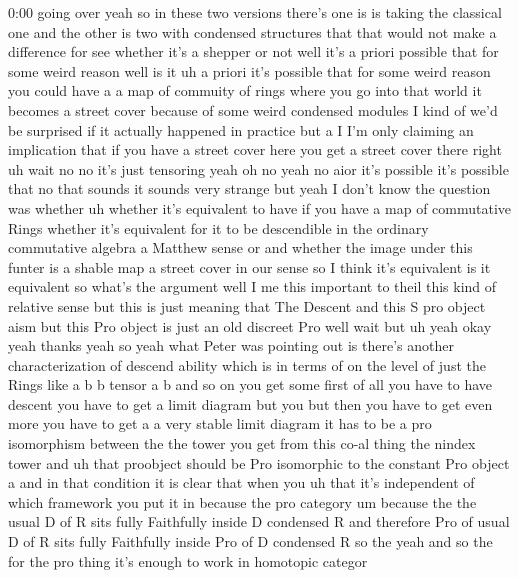 \begin{unfinished}{0:00}
going
over
yeah  so  in  these  two  versions  there's
one  is  is  taking  the  classical  one  and
the  other  is  two  with  condensed
structures  that  that  would  not  make  a
difference  for  see  whether  it's  a
shepper  or
not  well  it's  a  priori  possible  that  for
some  weird  reason  well  is
it
uh  a  priori  it's  possible  that  for  some
weird  reason  you  could  have  a  a  map  of
commuity  of  rings  where  you  go  into  that
world  it  becomes  a  street  cover  because
of  some  weird  condensed  modules
I  kind  of  we'd  be  surprised  if  it
actually  happened  in  practice  but  a  I
I'm  only  claiming  an  implication  that  if
you  have  a  street  cover  here  you  get  a
street  cover  there  right  uh  wait  no  no
it's  just  tensoring  yeah  oh  no  yeah  no
aior  it's  possible  it's
possible  that  no  that  sounds  it  sounds
very  strange  but  yeah  I  don't  know  the
question  was  whether  uh  whether  it's
equivalent  to  have  if  you  have  a  map  of
commutative  Rings  whether  it's
equivalent  for  it  to  be  descendible  in
the  ordinary  commutative  algebra  a
Matthew  sense  or  and  whether  the  image
under  this  funter  is  a  shable  map  a
street  cover  in  our  sense  so  I  think
it's  equivalent  is  it  equivalent  so
what's  the
argument  well  I  me  this  important  to
theil  this  kind  of  relative  sense  but
this  is  just  meaning  that
The  Descent  and  this  S  pro  object
aism  but  this  Pro  object  is  just  an  old
discreet  Pro  well  wait
but
uh
yeah  okay  yeah
thanks
yeah  so  yeah  what  Peter  was  pointing  out
is  there's  another  characterization  of
descend  ability  which  is  in  terms  of  on
the  level  of  just  the  Rings  like  a  b  b
tensor  a  b  and  so  on  you  get  some  first
of  all  you  have  to  have  descent  you  have
to  get  a  limit  diagram  but  you  but  then
you  have  to  get  even  more  you  have  to
get  a
a  very  stable  limit  diagram  it  has  to  be
a  pro  isomorphism  between  the  the  tower
you  get  from  this  co-al  thing  the  nindex
tower  and  uh  that  proobject  should  be
Pro  isomorphic  to  the  constant  Pro
object  a  and  in  that  condition  it  is
clear  that  when  you  uh  that  it's
independent  of  which  framework  you  put
it  in  because  the  pro  category  um
because  the  the  usual  D  of  R  sits  fully
Faithfully  inside  D  condensed  R  and
therefore  Pro  of  usual  D  of  R  sits  fully
Faithfully  inside  Pro  of  D  condensed  R
so
the  yeah  and  so  the  for  the  pro  thing
it's  enough  to  work  in  homotopic  categor

\end{unfinished}
